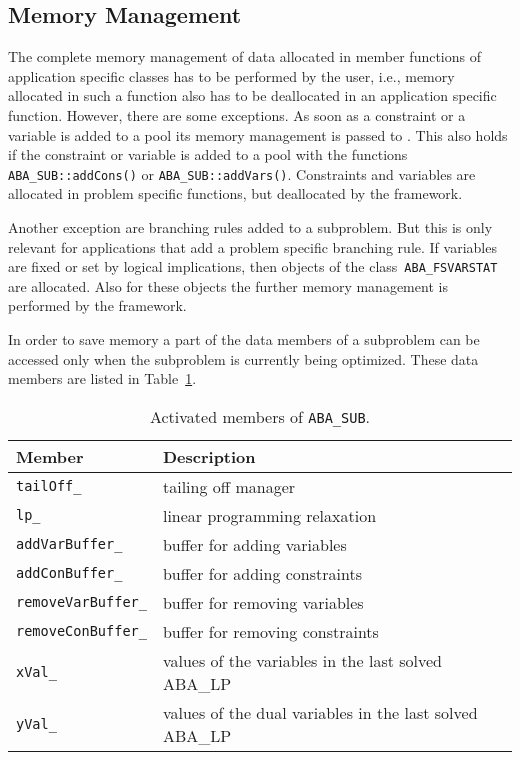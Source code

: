 \subsection{Memory Management}
\label{section:memoryManagement}

The complete memory management of data allocated in member functions
of application specific classes has to be performed by the user, i.e.,
memory allocated in such a function also has to be deallocated in
an application specific function. However, there are some exceptions.
As soon as a constraint or a variable is added to a pool
its memory management is passed to \ABACUS. This also holds if the
constraint or variable is added to a pool with the functions 
{\tt ABA\_SUB::addCons()} or
{\tt ABA\_SUB::addVars()}.
Constraints and variables are
allocated in problem specific functions, but deallocated by the
framework.

Another exception are branching rules added to a 
subproblem. But this is only relevant for applications that
add a problem specific branching rule. If variables are fixed or
set by logical implications, then objects of the 
class~{\tt ABA\_FSVARSTAT}
are allocated. Also for these objects the further memory management
is performed by the framework.

In order to save memory a part of the data members of a subproblem
can be accessed only when the subproblem is currently being optimized.
These data members are listed in Table~\ref{table:activatedDataOfSub}.

\begin{table}[htb]
\begin{center}
\begin{tabular}{|l|l|}
   \hline
   Member & Description \\
   \hline
   {\tt tailOff\_} &  tailing off manager \\
   {\tt lp\_}      &  linear programming relaxation \\
   {\tt addVarBuffer\_} &  buffer for adding variables \\
   {\tt addConBuffer\_} &  buffer for adding constraints \\
   {\tt removeVarBuffer\_} &  buffer for removing variables \\
   {\tt removeConBuffer\_} &  buffer for removing constraints \\
   {\tt xVal\_} &  values of the variables in the last solved ABA\_LP \\
   {\tt yVal\_} &  values of the dual variables in the last solved ABA\_LP \\
   \hline
\end{tabular}
\caption{Activated members of {\tt ABA\_SUB}.}
\label{table:activatedDataOfSub}
\end{center}
\end{table}

